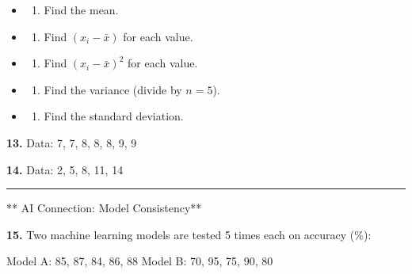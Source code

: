 \documentclass[
  11pt,
]{article}
\providecommand{\tightlist}{%
  \setlength{\itemsep}{0pt}\setlength{\parskip}{0pt}}
\begin{document}
\begin{itemize}
\item
  \begin{enumerate}
  \def\labelenumi{(\alph{enumi})}
  \tightlist
  \item
    Find the mean.
  \end{enumerate}
\item
  \begin{enumerate}
  \def\labelenumi{(\alph{enumi})}
  \setcounter{enumi}{1}
  \tightlist
  \item
    Find \((x_i - \bar{x})\) for each value.
  \end{enumerate}
\item
  \begin{enumerate}
  \def\labelenumi{(\alph{enumi})}
  \setcounter{enumi}{2}
  \tightlist
  \item
    Find \((x_i - \bar{x})^2\) for each value.
  \end{enumerate}
\item
  \begin{enumerate}
  \def\labelenumi{(\alph{enumi})}
  \setcounter{enumi}{3}
  \tightlist
  \item
    Find the variance (divide by \(n = 5\)).
  \end{enumerate}
\item
  \begin{enumerate}
  \def\labelenumi{(\alph{enumi})}
  \setcounter{enumi}{4}
  \tightlist
  \item
    Find the standard deviation.
  \end{enumerate}
\end{itemize}

\textbf{13.} Data: 7, 7, 8, 8, 8, 9, 9

\textbf{14.} Data: 2, 5, 8, 11, 14

\begin{center}\rule{0.5\linewidth}{0.5pt}\end{center}

** AI Connection: Model Consistency**

\textbf{15.} Two machine learning models are tested 5 times each on
accuracy (\%):

Model A: 85, 87, 84, 86, 88 Model B: 70, 95, 75, 90, 80
\end{document}
